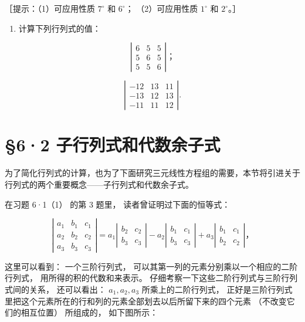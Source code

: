 ［提示：（1）可应用性质 \(7^{\circ}\) 和 \(6^{\circ}\)； （2）可应用性质
\(1^{\circ}\) 和 \(2^{\circ}\)。］

\begin{enumerate}[start=3]
\item
  计算下列行列式的值：
\end{enumerate}

\[
\left| \begin{array}{ccc} 6 & 5 & 5 \\ 5 & 6 & 5 \\ 5 & 5 & 6 \end{array} \right|\text{；} \tag {1}
\]

\[
\left| \begin{array}{ccc} - 12 & 13 & 11 \\ - 13 & 12 & 13 \\ - 11 & 11 & 12 \end{array} \right|. \tag {2}
\]

\section{§6·2 子行列式和代数余子式}

为了简化行列式的计算，也为了下面研究三元线性方程组的需要，本节将引进关于行列式的两个重要概念------子行列式和代数余子式。

在习题 6·1（1） 的第 3 题里， 读者曾证明过下面的恒等式：

\[
\left| \begin{array}{lll} a _ {1} & b _ {1} & c _ {1} \\ a _ {2} & b _ {2} & c _ {2} \\ a _ {3} & b _ {3} & c _ {3} \end{array} \right| = a _ {1} \left| \begin{array}{ll} b _ {2} & c _ {2} \\ b _ {3} & c _ {3} \end{array} \right| - a _ {2} \left| \begin{array}{ll} b _ {1} & c _ {1} \\ b _ {3} & c _ {3} \end{array} \right| + a _ {3} \left| \begin{array}{ll} b _ {1} & c _ {1} \\ b _ {2} & c _ {2} \end{array} \right|\text{，} \tag {1}
\]

这里可以看到： 一个三阶行列式，
可以其第一列的元素分别乘以一个相应的二阶行列式，
用所得的积的代数和来表示。
仔细考察一下这些二阶行列式与三阶行列式间的关系， 还可以看出：
\(a_{1}, a_{2}, a_{3}\) 所乘上的二阶行列式，
正好是三阶行列式里把这个元素所在的行和列的元素全部划去以后所留下来的四个元素
（不改变它们的相互位置） 所组成的， 如下图所示：

